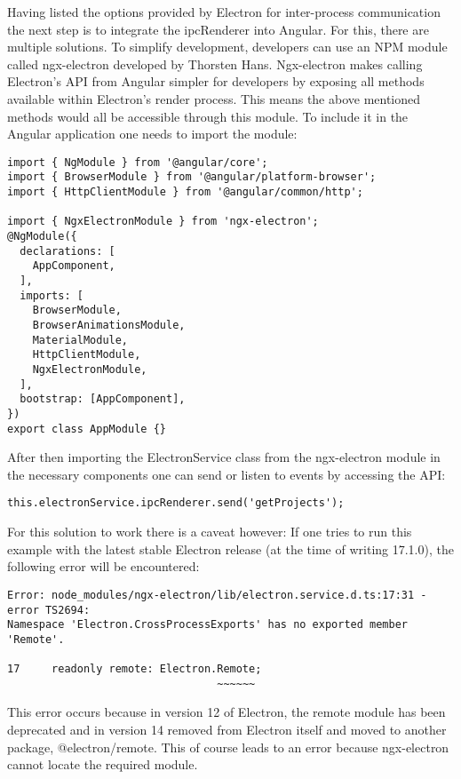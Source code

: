 Having listed the options provided by Electron for inter-process communication the next step is to integrate the ipcRenderer into Angular.
For this, there are multiple solutions. 
To simplify development, developers can use an NPM module called ngx-electron developed by Thorsten Hans. \parencite{ngxElectron}
Ngx-electron makes calling Electron's API from Angular simpler for developers by exposing all methods available within Electron's
render process.
This means the above mentioned methods would all be accessible through this module. 
To include it in the Angular application one needs to import the module:
\begin{lstlisting}[caption=Importing ngx-electron's ElectronService into Angular]
import { NgModule } from '@angular/core';
import { BrowserModule } from '@angular/platform-browser';
import { HttpClientModule } from '@angular/common/http';

import { NgxElectronModule } from 'ngx-electron';
@NgModule({
  declarations: [
    AppComponent,
  ],
  imports: [
    BrowserModule,
    BrowserAnimationsModule,
    MaterialModule,
    HttpClientModule,
    NgxElectronModule,
  ],
  bootstrap: [AppComponent],
})
export class AppModule {}
\end{lstlisting}
After then importing the ElectronService class from the ngx-electron module in the necessary components 
one can send or listen to events by accessing the API:
\begin{lstlisting}[caption=Sending an event with ngx-electron]
this.electronService.ipcRenderer.send('getProjects');
\end{lstlisting}
For this solution to work there is a caveat however: 
If one tries to run this example with the latest stable Electron release (at the time of writing 17.1.0), the 
following error will be encountered:
\begin{lstlisting}[caption=Error with ngx-electron and Electron > 13.6.9]
Error: node_modules/ngx-electron/lib/electron.service.d.ts:17:31 - error TS2694: 
Namespace 'Electron.CrossProcessExports' has no exported member 'Remote'.

17     readonly remote: Electron.Remote;
                                 ~~~~~~
\end{lstlisting}
This error occurs because in version 12 of Electron, the remote module has been deprecated and in version 14
removed from Electron itself and moved to another package, @electron/remote. \parencite{electron14Blog}
This of course leads to an error because ngx-electron cannot locate the required module. 
